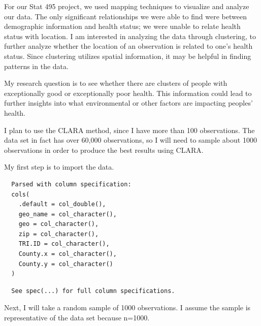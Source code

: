 \documentclass[12pt,twoside]{amherstthesis}
\begin{document}
  For our Stat 495 project, we used mapping techniques to visualize and
  analyze our data. The only significant relationships we were able to
  find were between demographic information and health status; we were
  unable to relate health status with location. I am interested in
  analyzing the data through clustering, to further analyze whether the
  location of an observation is related to one's health status. Since
  clustering utilizes spatial information, it may be helpful in finding
  patterns in the data.
  
  My research question is to see whether there are clusters of people with
  exceptionally good or exceptionally poor health. This information could
  lead to further insights into what environmental or other factors are
  impacting peoples' health.
  
  I plan to use the CLARA method, since I have more than 100 observations.
  The data set in fact has over 60,000 observations, so I will need to
  sample about 1000 observations in order to produce the best results
  using CLARA.
  
  My first step is to import the data.
  
  \begin{Shaded}
  \begin{Highlighting}[]
  \StringTok{ }\NormalTok{(}\NormalTok{)}
  \end{Highlighting}
  \end{Shaded}
  
  \begin{verbatim}
  Parsed with column specification:
  cols(
    .default = col_double(),
    geo_name = col_character(),
    geo = col_character(),
    zip = col_character(),
    TRI.ID = col_character(),
    County.x = col_character(),
    County.y = col_character()
  )
  \end{verbatim}
  
  \begin{verbatim}
  See spec(...) for full column specifications.
  \end{verbatim}
  
  Next, I will take a random sample of 1000 observations. I assume the
  sample is representative of the data set because n=1000.
  
  \begin{Shaded}
  \begin{Highlighting}[]
  \NormalTok{(}\NormalTok{)}
  \StringTok{ }\NormalTok{data_subset[}\NormalTok{(}\OperatorTok{:}\NormalTok{,}
     \NormalTok{),]}
  \end{Highlighting}
  \end{Shaded}
  
\end{document}
